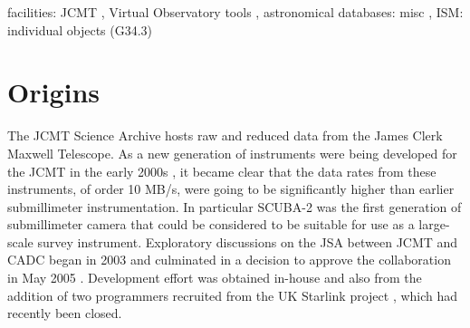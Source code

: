 \documentclass[final,authoryear,5p,times,twocolumn]{elsarticle}
\begin{document}
\begin{frontmatter}
\begin{abstract}
\end{abstract}

\begin{keyword}


facilities: JCMT \sep
Virtual Observatory tools \sep
astronomical databases: misc \sep
ISM: individual objects (G34.3)

\end{keyword}

\end{frontmatter}


\newcommand{\mnras}{MNRAS}
\newcommand{\aap}{A\&A}
\newcommand{\aaps}{A\&AS}
\newcommand{\pasp}{PASP}
\newcommand{\apj}{ApJ}
\newcommand{\apjs}{ApJS}
\newcommand{\qjras}{QJRAS}
\newcommand{\an}{Astron.\ Nach.}
\newcommand{\ijimw}{Int.\ J.\ Infrared \& Millimeter Waves}
\newcommand{\procspie}{Proc.\ SPIE}
\newcommand{\aspconf}{ASP Conf. Ser.}



\newcommand{\ascl}[1]{\href{http://www.ascl.net/#1}{ascl:#1}}


\section{Origins}

The JCMT Science Archive
\citep[JSA;][]{2008SPIE.7016E..16G,2008ASPC..394..450E,2008ASPC..394..135G,2011ASPC..442..203E}
hosts raw and reduced data from the James Clerk Maxwell Telescope. As
a new generation of instruments were being developed for the JCMT in
the early 2000s \citep[HARP/ACSIS \& SCUBA-2;][]{2000ASPC..217...33D,2003SPIE.4855....1H},
it became clear that
the data rates from these instruments, of order 10 MB/s, were going to be significantly
higher than earlier submillimeter instrumentation. In
particular SCUBA-2 was the first generation of submillimeter camera
that could be considered to be suitable for use as a large-scale
survey instrument. Exploratory discussions on the JSA between JCMT and CADC
began in 2003 and culminated in a decision to approve the
collaboration in May 2005 \citep{2005JCMTN23}. Development effort was
obtained in-house and also from the addition of two programmers recruited from
the UK Starlink project \citep{1982QJRAS..23..485D}, which had recently been closed.
\end{document}
